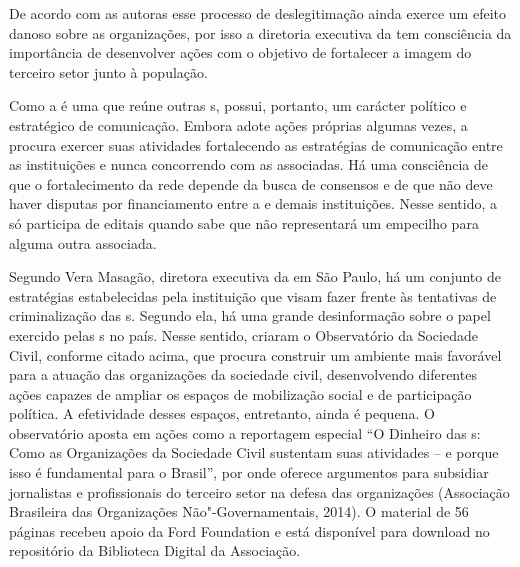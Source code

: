 De acordo com as autoras esse processo de deslegitimação ainda exerce um
efeito danoso sobre as organizações, por isso a diretoria executiva da
 tem consciência da importância de desenvolver ações com o objetivo
de fortalecer a imagem do terceiro setor junto à população.

Como a  é uma  que reúne outras s, possui, portanto, um
carácter político e estratégico de comunicação. Embora adote ações
próprias algumas vezes, a  procura exercer suas atividades
fortalecendo as estratégias de comunicação entre as instituições e nunca
concorrendo com as associadas. Há uma consciência de que o
fortalecimento da rede depende da busca de consensos e de que não deve
haver disputas por financiamento entre a  e demais instituições.
Nesse sentido, a  só participa de editais quando sabe que não
representará um empecilho para alguma outra  associada.

Segundo Vera Masagão, diretora executiva da  em São Paulo, há um
conjunto de estratégias estabelecidas pela instituição que visam fazer
frente às tentativas de criminalização das s. Segundo ela, há uma
grande desinformação sobre o papel exercido pelas s no país. Nesse
sentido, criaram o Observatório da Sociedade Civil, conforme citado
acima, que procura construir um ambiente mais favorável para a atuação
das organizações da sociedade civil, desenvolvendo diferentes ações
capazes de ampliar os espaços de mobilização social e de participação
política. A efetividade desses espaços, entretanto, ainda é pequena. O
observatório aposta em ações como a reportagem especial ``O Dinheiro das
s: Como as Organizações da Sociedade Civil sustentam suas atividades
-- e porque isso é fundamental para o Brasil'', por onde oferece
argumentos para subsidiar jornalistas e profissionais do terceiro setor
na defesa das organizações (Associação Brasileira das Organizações
Não"-Governamentais, 2014). O material de 56 páginas recebeu apoio da
Ford Foundation e está disponível para download no repositório da
Biblioteca Digital da Associação.

